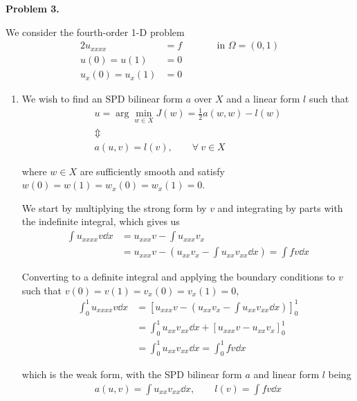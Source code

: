 \textbf{Problem 3.}

We consider the fourth-order 1-D problem
\begin{alignat}{2}
    u_{xxxx} &= f \qquad&& \text{in $\Omega = (0,1)$} \\
    u(0) = u(1) &= 0 \\
    u_x(0) = u_x(1) &= 0
\end{alignat}

\begin{enumerate}[label=(\alph*),leftmargin=*,itemsep=0mm]

    \item We wish to find an SPD bilinear form $a$ over $X$ and a linear form $l$ such that
    \begin{gather*}
        u = \arg\min_{w\in X}J(w) = \frac{1}{2}a(w,w) - l(w) \\
        \Updownarrow \\
        a(u,v) = l(v), \qquad \forall\>v\in X
    \end{gather*}
    
    where $w\in X$ are sufficiently smooth and satisfy $w(0) = w(1) = w_x(0) = w_x(1) = 0$.
    
    We start by multiplying the strong form by $v$ and integrating by parts with the indefinite integral, which gives us
    \begin{align}
        \int u_{xxxx} v \dd{x} &= u_{xxx}v - \int u_{xxx}v_x \nonumber \\
        &= u_{xxx}v - \left( u_{xx}v_x - \int u_{xx}v_{xx} \dd{x} \right) = \int fv \dd{x}
    \end{align}
    
    Converting to a definite integral and applying the boundary conditions to $v$ such that $v(0) = v(1) = v_x(0) = v_x(1) = 0$,
    \begin{align}
        \int_0^1 u_{xxxx} v \dd{x}
        &= \left[ u_{xxx}v - \left( u_{xx}v_x - \int u_{xx}v_{xx} \dd{x} \right) \right]_0^1 \nonumber \\
        &= \int_0^1 u_{xx}v_{xx} \dd{x} + [u_{xxx}v-u_{xx}v_x]_0^1 \nonumber \\
        &= \int_0^1 u_{xx}v_{xx} \dd{x} = \int_0^1 fv \dd{x}
    \end{align}
    
    which is the weak form, with the SPD bilinear form $a$ and linear form $l$ being
    \begin{align}
        a(u,v) = \int u_{xx}v_{xx} \dd{x}, \qquad l(v) = \int fv \dd{x}
    \end{align}
    

\end{enumerate}

